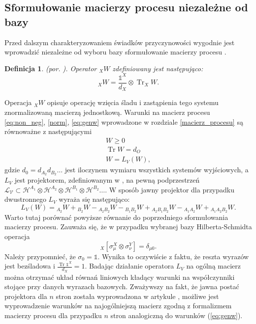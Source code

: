 \documentclass[10pt]{article} %
\newtheorem{definicja}{Definicja}
\DeclareMathOperator{\Trs}{Tr}
\newcommand{\Hx}[1]{\mathcal{H}^{#1}}
\newcommand{\I}{\mathbb{1}}
\begin{document}
\subsection{Sformułowanie macierzy procesu niezależne od bazy}
Przed dalszym charakteryzowaniem świadków przyczynowości wygodnie jest wprowadzić niezależne od wyboru bazy sformułowanie macierzy procesu \cite{causal_witness}.
\begin{definicja}
(por. \cite{causal_witness}).
Operator ${}_XW$ zdefiniowany jest następująco:
\begin{equation}
{}_X W = \frac{\I^X}{d_X} \otimes \Trs_X W.
\end{equation}
\end{definicja}
Operacja ${}_XW$ opisuje operację wzięcia śladu i zastąpienia tego systemu znormalizowaną macierzą jednostkową.
Warunki na macierz procesu \eqref{eq:non_neg}, \eqref{norm}, \eqref{eq:genw} wprowadzone w rozdziale \ref{macierz_procesu} są równoważne z następującymi
\begin{gather}
W \geq 0 \\
\Trs W = d_O \\
W = L_V\left(W\right),
\end{gather}
gdzie $d_0 = d_{A_2} d_{B_2} \dots$ jest iloczynem wymiaru wszystkich systemów wyjściowych, a $L_V$ jest projektorem, zdefiniowanym w \cite{causal_witness}, na pewną podprzestrzeń 
$\mathcal{L_V} \subset \Hx{A_1} \otimes \Hx{A_2} \otimes \Hx{B_1} \otimes \Hx{B_2} \dots$.
W sposób jawny projektor dla przypadku dwustronnego $L_V$ wyraża się następująco:
\begin{equation}
\label{eq:projec2}
L_V(W) = {}_{A_2}W + {}_{B_2}W - {}_{A_2B_2}W - {}_{B_1B_2}W + {}_{A_2B_1B_2}W - {}_{A_1A_2}W + {}_{A_1A_2B_2}W.
\end{equation}
Warto tutaj porównać powyższe równanie do poprzedniego sformułowania macierzy procesu. Zauważa się, że w przypadku wybranej bazy Hilberta-Schmidta
operacja
\begin{equation}
{}_X\left[\sigma_\mu^X \otimes \sigma_\nu^Y\right] = \delta_{\mu0}.
\end{equation}
Należy przypomnieć, że $\sigma_0 = \I$.
Wynika to oczywiście z faktu, że reszta wyrazów jest bezśladowa i $\frac{\Trs \I^X}{d_X} = 1$. Badając działanie operatora $L_V$ na ogólną macierz można otrzymać układ równań liniowych kładący warunki na współczynniki stojące przy danych wyrazach bazowych. Zważywszy na fakt, że jawna postać projektora dla $n$ stron została wyprowadzona w artykule \cite{causal_witness}, możliwe jest wyprowadzenie warunków na najogólniejszą macierz zgodną z formalizmem macierzy procesu dla przypadku $n$ stron analogiczną do warunków (\ref{eq:genw}). 
\end{document}
